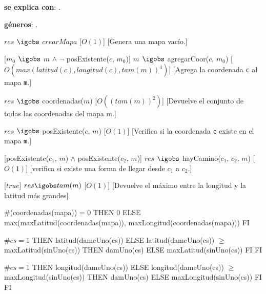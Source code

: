 \begin{Interfaz}


\textbf{se explica con}: .

\textbf{g\'eneros}: .



%
{$res$ $\igobs$ $crearMapa$}%
[$O(1)$]
[Genera una mapa vac\'io.]


[$m_0$ $\igobs$ $m$ $\land$ $\lnot$ posExistente($c$, $m_0$)]  
{$m$ $\igobs$ agregarCoor($c$, $m_0$)}
[$O(  max(latitud(c), longitud(c), tam(m))^4  )$]
[Agrega la coordenada \texttt{c} al mapa \texttt{m}.]


%
{$res$ $\igobs$ coordenadas($m$)}%
[$O((tam(m))^2)$]  %
[Devuelve el conjunto de todas las coordenadas del mapa m.]


{$res$ $\igobs$ posExistente($c$, $m$)}
[$O(1)$]
[Verifica si la coordenada \texttt{c} existe en el mapa \texttt{m}.]


[posExistente($c_1$, $m$) $\land$ posExistente($c_2$, $m$)]
{$res$ $\igobs$ hayCamino($c_1$, $c_2$, $m$)}
[$O(1)$]
[verifica si existe una forma de llegar desde \texttt{$c_1$} a \texttt{$c_2$}.]

[$true$]
{$res \igobs tam(m)$}
[$O(1)$]
[Devuelve el m\'aximo entre la longitud y la latitud m\'as grandes]

  
\begin{tad}{}



{
\IF
$\#$(coordenadas(mapa)) = 0
THEN
0
ELSE
max(maxLatitud(coordenadas(mapa)), maxLongitud(coordenadas(mapa)))
FI
}


{
\IF
$\#cs = 1$
THEN
latitud(dameUno(cs))
ELSE
{
\IF latitud(dameUno(cs)) $\geq$ maxLatitud(sinUno(cs))
THEN
damUno(cs)
ELSE
maxLatitud(sinUno(cs))
FI
}
FI}


{
\IF
$\#cs = 1$
THEN
longitud(dameUno(cs))
ELSE
{
\IF longitud(dameUno(cs)) $\geq$ maxLongitud(sinUno(cs))
THEN
damUno(cs)
ELSE
maxLongitud(sinUno(cs))
FI
}
FI}


\end{tad}



\end{Interfaz}


